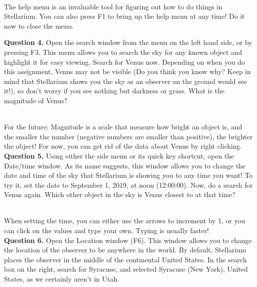 \documentclass[11pt]{article}
\begin{document}
\hrulefill\\

The help menu is an invaluable tool for figuring out how to do things in Stellarium. You can also press F1 to bring up the help menu at any time! Do it now to close the menu.

\newpage

\textbf{Question 4.} Open the search window from the menu on the left hand side, or by pressing F3. This menu allows you to search the sky for any known object and highlight it for easy viewing. Search for Venus now. Depending on when you do this assignment, Venus may not be visible (Do you think you know why? Keep in mind that Stellarium shows you the sky as an observer on the ground would see it!), so don't worry if you see nothing but darkness or grass. What is the magnitude of Venus?\\
\vspace*{1.5cm}

\hrulefill\\
For the future: Magnitude is a scale that measure how bright an object is, and the smaller the number (negative numbers are smaller than positive), the brighter the object! For now, you can get rid of the data about Venus by right clicking.\\

\textbf{Question 5.} Using either the side menu or its quick key shortcut, open the Date/time window. As its name suggests, this window allows you to change the date and time of the sky that Stellarium is showing you to any time you want! To try it, set the date to September 1, 2019, at noon (12:00:00). Now, do a search for Venus again. Which other object in the sky is Venus closest to at that time?\\
\vspace*{1.5cm}

\hrulefill\\
When setting the time, you can either use the arrows to increment by 1, or you can click on the values and type your own. Typing is usually faster!\\

\textbf{Question 6.} Open the Location window (F6). This window allows you to change the location of the observer to be anywhere in the world. By default, Stellarium places the observer in the middle of the continental United States. In the search box on the right, search for Syracuse, and selected Syracuse (New York), United States, as we certainly aren't in Utah.\\
\end{document}

